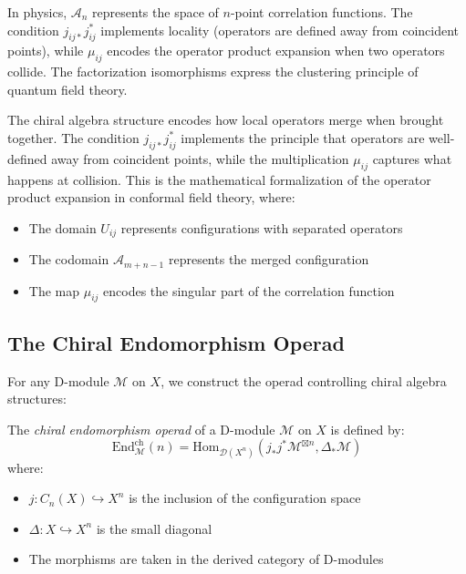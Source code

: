 \begin{remark}
In physics, $\mathcal{A}_n$ represents the space of $n$-point correlation functions. The condition 
$j_{ij*}j_{ij}^*$ implements locality (operators are defined away from coincident points), while 
$\mu_{ij}$ encodes the operator product expansion when two operators collide. The factorization 
isomorphisms express the clustering principle of quantum field theory.
\end{remark}

\begin{remark} The chiral algebra structure encodes how local operators merge when brought together. The condition $j_{ij*}j_{ij}^*$ implements the principle that operators are well-defined away from coincident points, while the multiplication $\mu_{ij}$ captures what happens at collision. This is the mathematical formalization of the operator product expansion in conformal field theory, where:
\begin{itemize}
\item The domain $U_{ij}$ represents configurations with separated operators
\item The codomain $\mathcal{A}_{m+n-1}$ represents the merged configuration  
\item The map $\mu_{ij}$ encodes the singular part of the correlation function
\end{itemize}
\end{remark}

\subsection{The Chiral Endomorphism Operad}
 
For any D-module $\mathcal{M}$ on $X$, we construct the operad controlling chiral algebra structures:
 
\begin{definition}\label{def:chiral-endo}
The \emph{chiral endomorphism operad} of a D-module $\mathcal{M}$ on $X$ is defined by:
\[
\text{End}_{\mathcal{M}}^{\text{ch}}(n) = \text{Hom}_{\mathcal{D}(X^n)}\left(j_*j^*\mathcal{M}^{\boxtimes n}, \Delta_*\mathcal{M}\right)
\]
where:
\begin{itemize}
\item $j: C_n(X) \hookrightarrow X^n$ is the inclusion of the configuration space
\item $\Delta: X \hookrightarrow X^n$ is the small diagonal
\item The morphisms are taken in the derived category of D-modules
\end{itemize}
\end{definition}
 
